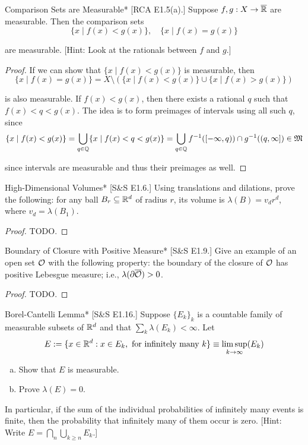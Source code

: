 \begin{problem}{Comparison Sets are Measurable}*
    [RCA E1.5(a).] Suppose $f,g : X \to \overline{\mathbb{R}}$ are measurable. Then the comparison sets 
    $$
        \{x \mid f(x) < g(x)\}, \quad \{x \mid f(x) = g(x)\}
    $$

    are measurable. [Hint: Look at the rationals between $f$ and $g$.]
\end{problem}

\begin{proof}
    If we can show that $\{x \mid f(x) < g(x)\}$ is measurable, then 
    $$
        \{x \mid f(x) = g(x)\} = X \setminus (\{x \mid f(x) < g(x)\} \cup \{x \mid f(x) > g(x)\})
    $$ 

    is also measurable. If $f(x) < g(x)$, then there exists a rational $q$ such that $f(x) < q < g(x)$. The idea is to form preimages of intervals using all such $q$, since 
    $$
    \{x \mid f(x) < g(x) \}
    = \bigcup_{q \in \mathbb{Q}} \{x \mid f(x) < q < g(x)\}
    = \bigcup_{q \in \mathbb{Q}} f^{-1}([-\infty, q)) \cap g^{-1}((q, \infty])
    \in \mathfrak{M}
    $$

    since intervals are measurable and thus their preimages as well. 
\end{proof}

\begin{problem}{High-Dimensional Volumes}*
    [S\&S E1.6.] Using translations and dilations, prove the following: for any ball $B_r \subseteq \mathbb{R}^d$ of radius $r$, its volume is $\lambda(B) = v_d r^d$, where $v_d = \lambda(B_1)$. 
\end{problem}

\begin{proof}
    TODO. 
\end{proof}

\begin{problem}{Boundary of Closure with Positive Measure}*
    [S\&S E1.9.] Give an example of an open set $\mathcal{O}$ with the following property: the boundary of the closure of $\mathcal{O}$ has positive Lebesgue measure; i.e., $\lambda(\partial \overline{\mathcal{O}}) > 0$. 
\end{problem}

\begin{proof}
    TODO. 
\end{proof}

\begin{problem}{Borel-Cantelli Lemma}*
    [S\&S E1.16.] Suppose $\{E_k\}_k$ is a countable family of measurable subsets of $\mathbb{R}^d$ and that $\sum_k \lambda(E_k) < \infty$. Let 
    $$
    E := \{x \in \mathbb{R}^d : x \in E_k, \text{ for infinitely many } k\}
    \equiv \limsup_{k \to \infty} (E_k)
    $$

    \begin{enumerate}[(a)]
        \item Show that $E$ is measurable. 
        \item Prove $\lambda(E) = 0$. 
    \end{enumerate}
    In particular, if the sum of the individual probabilities of infinitely many events is finite, then the probability that infinitely many of them occur is zero. [Hint: Write $E = \bigcap_n \bigcup_{k \geq n} E_k$.]
\end{problem}

